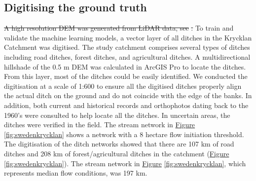 \documentclass[11pt, review]{elsarticle} %
\providecommand{\DIFdeltex}[1]{{\protect\color{red}\sout{#1}}}                      %
\providecommand{\DIFaddend}{} %
\providecommand{\DIFdelbegin}{} %
\providecommand{\DIFdelend}{} %
\providecommand{\DIFdel}[1]{\texorpdfstring{\DIFdeltex{#1}}{}} %
\begin{document}
\DIFaddend \subsection{Digitising the ground truth}
\DIFdelbegin \DIFdel{A high resolution DEM was generated from LiDAR data, see }%
\DIFdel{. }\DIFdelend To train and validate the machine learning models, a vector layer of all ditches in the Krycklan Catchment \citep{krycklancatchment} was digitised. The study catchment comprises several types of ditches including road ditches, forest ditches, and agricultural ditches. A multidirectional hillshade of the 0.5 m DEM was calculated in ArcGIS Pro to locate the ditches. From this layer, most of the ditches could be easily identified. We conducted the digitisation at a scale of 1:600 to ensure all the digitised ditches properly align the actual ditch on the ground and do not coincide with the edge of the banks. In addition, both current and historical records and orthophotos dating back to the 1960's were consulted to help locate all the ditches. In uncertain areas, the ditches were verified in the field. The stream network in \hyperref[fig:swedenkrycklan]{Figure} \ref{fig:swedenkrycklan} shows a network with a 8 hectare flow initiation threshold. The digitisation of the ditch networks showed that there are 107 km of road ditches and 208 km of forest/agricultural ditches in the catchment (\hyperref[fig:swedenkrycklan]{Figure} \ref{fig:swedenkrycklan}). The stream network in \hyperref[fig:swedenkrycklan]{Figure} \ref{fig:swedenkrycklan}, which represents median flow conditions, was 197 km.
\end{document}
